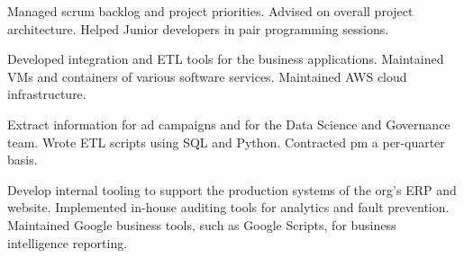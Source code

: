 \documentclass[10pt,a4paper]{altacv}
\begin{document}

\begin{fullwidth}
\makecvheader
\end{fullwidth}


Managed scrum backlog and project priorities. Advised on overall project architecture. 
Helped Junior developers in pair programming sessions.

\divider

Developed integration and ETL tools for the business applications. 
Maintained VMs and containers of various software services. Maintained AWS cloud infrastructure.

\divider

Extract information for ad campaigns and for the Data Science and Governance team.
Wrote ETL scripts using SQL and Python. Contracted pm a per-quarter basis.

\divider

Develop internal tooling to support the production systems of the org's ERP and website. 
Implemented in-house auditing tools for analytics and fault prevention. Maintained 
Google business tools, such as Google Scripts, for business intelligence reporting.
\end{document}
